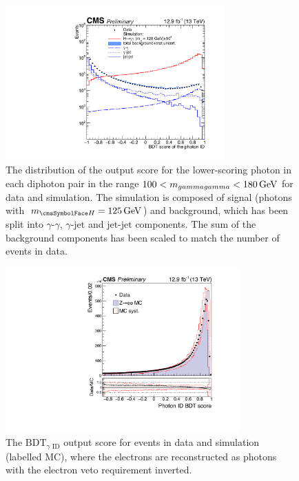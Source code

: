 \begin{figure}[hptb]
\centering \hspace{0.1cm}
\includegraphics[width=0.75\textwidth]{recoFigures/validation_phoID_ICHEP_4sideTicks.pdf}
\caption{
The distribution of the \PhoIdBdt output score for the lower-scoring photon in each diphoton pair in the range $100 < m_{gamma gamma} < 180\,\text{Ge\hspace{-.08em}V}$ for data and simulation. The simulation is composed of signal (\Hgg photons with $\mH=125\GeV$) and background, which has been split into $\gamma$-$\gamma$, $\gamma$-$\textrm{jet}$ and $\textrm{jet}$-$\textrm{jet}$ components. The sum of the background components has been scaled to match the number of events in data.}
\label{fig:reco:photon_id_score_hgg_bkg}
\end{figure}

\begin{figure}[hptb]
\centering 
\includegraphics[width=0.8\textwidth]{recoFigures/idmva_syst_combined.pdf}
\caption{ The $\text{BDT}_{\gamma\text{ ID}}$ output score for \Zee events in data and simulation (labelled MC), where 
the electrons are reconstructed as photons with the electron veto requirement inverted.}
\label{fig:reco:photon_id_zee_validation}
\end{figure}


